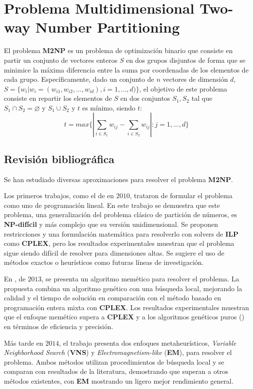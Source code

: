 \documentclass[12pt,letterpaper]{article}
\begin{document}
\section{Problema Multidimensional Two-way Number Partitioning}
El problema \textbf{M2NP} es un problema de optimización binario que consiste en partir un conjunto de vectores enteros $S$ en dos grupos disjuntos de forma que se minimice la máxima diferencia entre la suma por coordenadas de los elementos de cada grupo. Específicamente, dado un conjunto de $n$ vectores de dimensión $d$, $S=\{w_i|w_i=(w_{i1}, w_{i2},...,w_{id}), i=1,...,d)\}$, el objetivo de este problema consiste en repartir los elementos de $S$ en dos conjuntos $S_1, S_2$ tal que $S_1\cap S_2=\varnothing$ y $S_1\cup S_2$ y $t$ es mínimo, siendo $t$:
\begin{equation}
    t= max\{|\sum_{i\in S_1}w_{ij}-\sum_{i\in S_2}w_{ij}|:j=1,...,d\}
\end{equation}

\subsection{Revisión bibliográfica}
Se han estudiado diversas aproximaciones para resolver el problema \textbf{M2NP}.

Los primeros trabajos, como el de \cite{KOJIC20102302} en $2010$, trataron de formular el problema como uno de programación lineal. En este trabajo se demuestra que este problema, una generalización del problema clásico de partición de números, es \textbf{NP-difícil} y más complejo que su versión unidimensional. Se proponen restricciones y una formulación matemática para resolverlo con solvers de \textbf{ILP} como \textbf{CPLEX}, pero los resultados experimentales muestran que el problema sigue siendo difícil de resolver para dimensiones altas. Se sugiere el uso de métodos exactos o heurísticos como futuras líneas de investigación.

En \cite{POP20139191}, de $2013$, se presenta un algoritmo memético para resolver el problema. La propuesta combina un algoritmo genético con una búsqueda local, mejorando la calidad y el tiempo de solución en comparación con el método basado en programación entera mixta con \textbf{CPLEX}. Los resultados experimentales muestran que el enfoque memético supera a \textbf{CPLEX} y a los algoritmos genéticos puros (\cite{10.1007/978-3-642-44973-4_10}) en términos de eficiencia y precisión.

Más tarde en $2014$, el trabajo \cite{KRATICA201459} presenta dos enfoques metaheurísticos, \textit{Variable Neighborhood Search} (\textbf{VNS}) y \textit{Electromagnetism-like} (\textbf{EM}), para resolver el problema. Ambos métodos utilizan procedimientos de búsqueda local y se comparan con resultados de la literatura, demostrando que superan a otros métodos existentes, con \textbf{EM} mostrando un ligero mejor rendimiento general.
\end{document}
